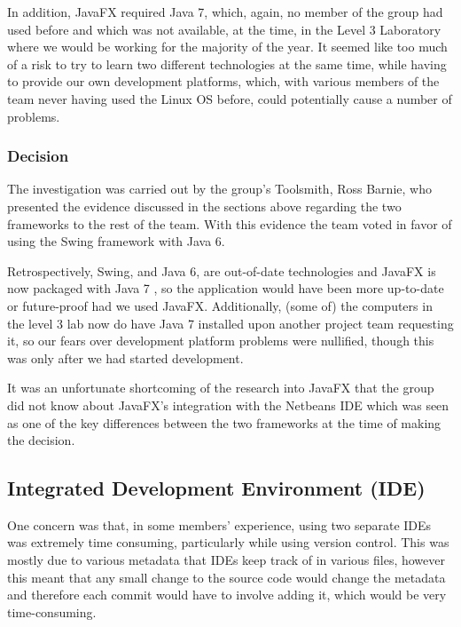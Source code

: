 In addition, JavaFX required Java 7, which, again, no member of the
group had used before and which was not available, at the time, in the
Level 3 Laboratory where we would be working for the majority of the
year.
It seemed like too much of a risk to try to learn two different
technologies at the same time, while having to provide our own
development platforms, which, with various members of the team never
having used the Linux OS before, could potentially cause a number of
problems.


\subsubsection{Decision}
\label{impl:ui:guiframework:decision}

The investigation was carried out by the group's Toolsmith, Ross
Barnie, who presented the evidence discussed in the sections above
regarding the two frameworks to the rest of the team.
With this evidence the team voted in favor of using the Swing
framework with Java 6.

Retrospectively, Swing, and Java 6, are out-of-date technologies and
JavaFX is now packaged with Java 7 \cite{javafxOverview}, so the
application would have been more up-to-date or future-proof had we
used JavaFX.
Additionally, (some of) the computers in the level 3 lab now do have
Java 7 installed upon another project team requesting it, so our fears
over development platform problems were nullified, though this was
only after we had started development.

It was an unfortunate shortcoming of the research into JavaFX that the
group did not know about JavaFX's integration with the Netbeans IDE
which was seen as one of the key differences between the two
frameworks at the time of making the decision.


\subsection{Integrated Development Environment (IDE)}
\label{impl:ui:ide}

One concern was that, in some members' experience, using two separate
IDEs was extremely time consuming, particularly while using version
control.
This was mostly due to various metadata that IDEs keep track of in
various files, however this meant that any small change to the source
code would change the metadata and therefore each commit would have to
involve adding it, which would be very time-consuming.

